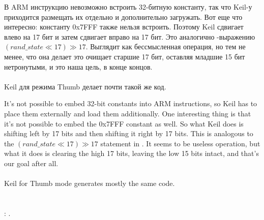 \ifdefined\RUSSIAN
В ARM инструкцию невозможно встроить 32-битную константу, так что Keil-у приходится размещать их отдельно и дополнительно загружать.
Вот еще что интересно: константу 0x7FFF также нельзя встроить.
Поэтому Keil сдвигает  влево на 17 бит и затем сдвигает вправо на 17 бит.
Это аналогично \CCpp{}-выражению $(rand\_state \ll 17) \gg 17$.
Выглядит как бессмысленная операция, но тем не менее, что она делает это очищает старшие 17 бит, оставляя младшие 15 бит нетронутыми, и это наша цель, в конце концов. \\
\\
\Optimizing Keil для режима Thumb делает почти такой же код.
\fi %

\ifdefined\ENGLISH
It's not possible to embed 32-bit constants into ARM instructions, so Keil has to place them externally and load them additionally.
One interesting thing is that it's not possible to embed the 0x7FFF constant as well.
So what Keil does is shifting  left by 17 bits and then shifting it right by 17 bits.
This is analogous to the $(rand\_state \ll 17) \gg 17$ statement in \CCpp.
It seems to be useless operation, but what it does is clearing the high 17 bits, leaving the low 15 bits intact, and that's our goal after all. \\
\\
\Optimizing Keil for Thumb mode generates mostly the same code.
\fi %



\section{}

%
: .
